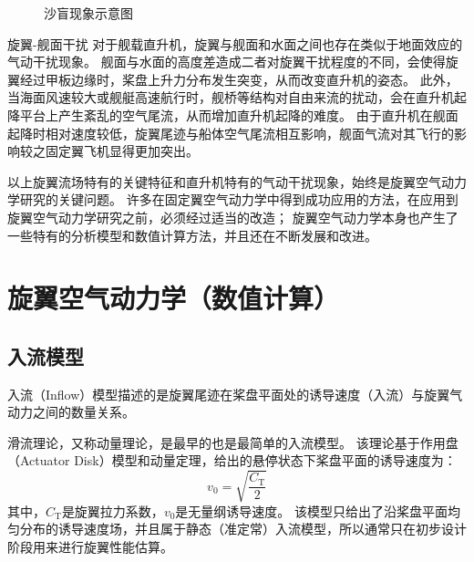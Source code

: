 \documentclass[doctor,openright,twoside,color]{buaathesis}
\begin{document}
\begin{compactdesc}
\begin{figure}[t!]
    \caption{沙盲现象示意图}\label{brownout}
\end{figure}
  \item[旋翼-舰面干扰]
  对于舰载直升机，旋翼与舰面和水面之间也存在类似于地面效应的气动干扰现象。
  舰面与水面的高度差造成二者对旋翼干扰程度的不同，会使得旋翼经过甲板边缘时，桨盘上升力分布发生突变，从而改变直升机的姿态。  
  此外，当海面风速较大或舰艇高速航行时，舰桥等结构对自由来流的扰动，会在直升机起降平台上产生紊乱的空气尾流，从而增加直升机起降的难度。
  由于直升机在舰面起降时相对速度较低，旋翼尾迹与船体空气尾流相互影响，舰面气流对其飞行的影响较之固定翼飞机显得更加突出。
\end{compactdesc}

以上旋翼流场特有的关键特征和直升机特有的气动干扰现象，始终是旋翼空气动力学研究的关键问题。
许多在固定翼空气动力学中得到成功应用的方法，在应用到旋翼空气动力学研究之前，必须经过适当的改造；
旋翼空气动力学本身也产生了一些特有的分析模型和数值计算方法，并且还在不断发展和改进。

\section{旋翼空气动力学（数值计算）}

\subsection{入流模型}
入流（Inflow）模型描述的是旋翼尾迹在桨盘平面处的诱导速度（入流）与旋翼气动力之间的数量关系。

滑流理论，又称动量理论，是最早的也是最简单的入流模型。
该理论基于作用盘（Actuator Disk）模型和动量定理，给出的悬停状态下桨盘平面的诱导速度为：
\begin{equation}
  v_{ \mathrm{0} }  = \sqrt{\frac{C_\mathrm{T}}{2}}
\end{equation}
其中，$C_\mathrm{T}$是旋翼拉力系数，$v_{ \mathrm{0} }$是无量纲诱导速度。
该模型只给出了沿桨盘平面均匀分布的诱导速度场，并且属于静态（准定常）入流模型，所以通常只在初步设计阶段用来进行旋翼性能估算。
\end{document}
